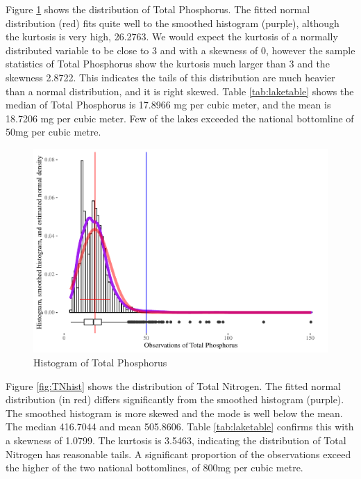 \documentclass[
]{article}
\begin{document}
Figure \ref{fig:tphist} shows the distribution of Total Phosphorus. The fitted normal distribution (red) fits quite well to the smoothed histogram (purple), although the kurtosis is very high, 26.2763. We would expect the kurtosis of a normally distributed variable to be close to 3 and with a skewness of 0, however the sample statistics of Total Phosphorus show the kurtosis much larger than 3 and the skewness 2.8722. This indicates the tails of this distribution are much heavier than a normal distribution, and it is right skewed. Table \ref{tab:laketable} shows the median of Total Phosphorus is 17.8966 mg per cubic meter, and the mean is 18.7206 mg per cubic meter. Few of the lakes exceeded the national bottomline of 50mg per cubic metre.

\begin{figure}
\centering
\includegraphics{Final-Report_files/figure-latex/tphist-1.pdf}
\caption{\label{fig:tphist}Histogram of Total Phosphorus}
\end{figure}

Figure \ref{fig:TNhist} shows the distribution of Total Nitrogen. The fitted normal distribution (in red) differs significantly from the smoothed histogram (purple). The smoothed histogram is more skewed and the mode is well below the mean. The median 416.7044 and mean 505.8606. Table \ref{tab:laketable} confirms this with a skewness of 1.0799. The kurtosis is 3.5463, indicating the distribution of Total Nitrogen has reasonable tails. A significant proportion of the observations exceed the higher of the two national bottomlines, of 800mg per cubic metre.
\end{document}
